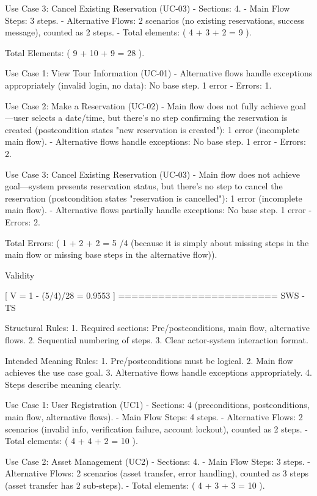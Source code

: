 Use Case 3: Cancel Existing Reservation (UC-03)
- Sections: 4.
- Main Flow Steps: 3 steps.
- Alternative Flows: 2 scenarios (no existing reservations, success message), counted as 2 steps.
- Total elements: ( 4 + 3 + 2 = 9 ).

Total Elements: ( 9 + 10 + 9 = 28 ).

Use Case 1: View Tour Information (UC-01)
- Alternative flows handle exceptions appropriately (invalid login, no data): No base step. 1 error
- Errors: 1.

Use Case 2: Make a Reservation (UC-02)
- Main flow does not fully achieve goal—user selects a date/time, but there’s no step confirming the reservation is created (postcondition states "new reservation is created"): 1 error (incomplete main flow).
- Alternative flows handle exceptions: No base step. 1 error
- Errors: 2.

Use Case 3: Cancel Existing Reservation (UC-03)
- Main flow does not achieve goal—system presents reservation status, but there’s no step to cancel the reservation (postcondition states "reservation is cancelled"): 1 error (incomplete main flow).
- Alternative flows partially handle exceptions: No base step. 1 error
- Errors: 2.

Total Errors: ( 1 + 2 + 2 = 5 /4 (because it is simply about missing steps in the main flow or missing base steps in the alternative flow)).

Validity 

[
V = 1 - (5/4)/28 = 0.9553
]
========================
SWS - TS

Structural Rules:
1. Required sections: Pre/postconditions, main flow, alternative flows.
2. Sequential numbering of steps.
3. Clear actor-system interaction format.

Intended Meaning Rules:
1. Pre/postconditions must be logical.
2. Main flow achieves the use case goal.
3. Alternative flows handle exceptions appropriately.
4. Steps describe meaning clearly.

Use Case 1: User Registration (UC1)
- Sections: 4 (preconditions, postconditions, main flow, alternative flows).
- Main Flow Steps: 4 steps.
- Alternative Flows: 2 scenarios (invalid info, verification failure, account lockout), counted as 2 steps.
- Total elements: ( 4 + 4 + 2 = 10 ).

Use Case 2: Asset Management (UC2)
- Sections: 4.
- Main Flow Steps: 3 steps.
- Alternative Flows: 2 scenarios (asset transfer, error handling), counted as 3 steps (asset transfer has 2 sub-steps).
- Total elements: ( 4 + 3 + 3 = 10 ).

